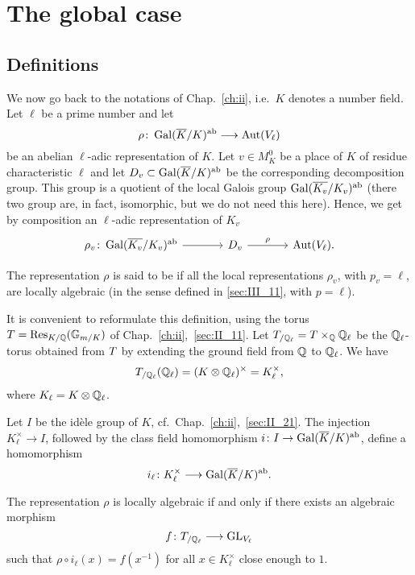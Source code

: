 \section{The global case}
\subsection{Definitions}
\label{sec:III_21}
We now go back to the notations of Chap.~\ref{ch:ii}, i.e.\ $K$ denotes a number
field. Let $\ell$ be a prime number and let 
\[
\rho \colon \operatorname{Gal}(\overline{K}/K)^{\mathrm{ab}} \longrightarrow \operatorname{Aut}(V_\ell)
\]
be an abelian $\ell$-adic representation
\dpage
of $K$.
Let $v \in M_K^0$ be a place of $K$ of residue characteristic $\ell$ and let
$D_v \subset \operatorname{Gal}(\overline{K}/K)^{\mathrm{ab}}$ be the corresponding decomposition group.
This group is a quotient of the local Galois group
$\operatorname{Gal}(\overline{K_v}/K_v)^{\mathrm{ab}}$ (there two group are, in fact, isomorphic, but we
do not need this here). Hence, we get by composition an $\ell$-adic
representation of $K_v$ 
\[\begin{tikzcd}[sep=large]
	\rho_v \colon \abcl{\Gal(\algcl{K_v}/K_v)} \rar & D_v \rar["\rho"] &
	\Aut(V_\ell).
\end{tikzcd}\]

\begin{mydef}
The representation $\rho$ is said to be  if all the
local representations $\rho_v$, with $p_v = \ell$, are locally algebraic (in the
sense defined in \ref{sec:III_11}, with $p = \ell$). 
\end{mydef}

It is convenient to reformulate this definition, using the torus $T =
\operatorname{Res}_{K/\mathbb{Q}} (\mathbb{G}_{m/K})$ of Chap.~\ref{ch:ii},~\ref{sec:II_11}. Let
$T_{/\mathbb{Q}_\ell} = T \times_{\mathbb{Q}} \mathbb{Q}_\ell$ be the $\mathbb{Q}_\ell$-torus obtained
from $T$ by extending the ground field from $\mathbb{Q}$ to $\mathbb{Q}_\ell$. We have
\[
T_{/\mathbb{Q}_\ell}(\mathbb{Q}_\ell) = (K \otimes \mathbb{Q}_\ell)^{\times} = K_{\ell}^\times,
\]
where $K_\ell = K \otimes \mathbb{Q}_\ell$. 

Let $I$ be the idèle group of $K$, cf.\ Chap.~\ref{ch:ii},~\ref{sec:II_21}. The
injection $K_\ell^\times \to I$, followed by the class field homomorphism $i
\colon I \to \operatorname{Gal}(\overline{K}/K)^{\mathrm{ab}}$, define a homomorphism
\[
i_\ell \colon K_\ell^\times \longrightarrow \operatorname{Gal}(\overline{K}/K)^{\mathrm{ab}}.
\]

\begin{prop}
The representation $\rho$
\dpage
is locally algebraic if and only if there exists an algebraic morphism 
\[
f \colon T_{/\mathbb{Q}_\ell} \longrightarrow \operatorname{GL}_{V_\ell}
\]
such that $\rho \circ i_\ell(x) = f(x^{-1})$ for all $x \in K_\ell^\times$
close enough to $1$. 
\end{prop}

